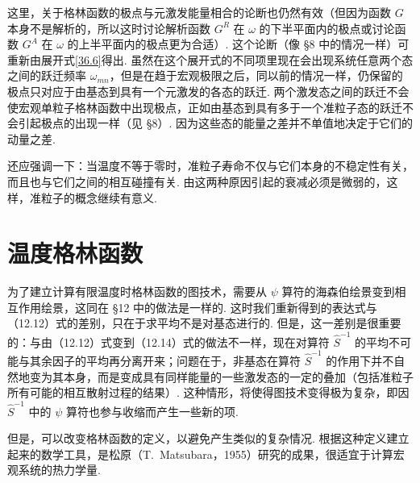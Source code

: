 这里，关于格林函数的极点与元激发能量相合的论断也仍然有效（但因为函数 $G$ 本身不是解析的，所以这时讨论解析函数 $G^{R}$ 在 $\omega$ 的下半平面内的极点或讨论函数 $G^{A}$ 在 $\omega$ 的上半平面内的极点更为合适）. 这个论断（像 §8 中的情况一样）可重新由展开式\eqref{36.6}得出. 虽然在这个展开式的不同项里现在会出现系统任意两个态之间的跃迁频率 $\omega_{mn}$，但是在趋于宏观极限之后，同以前的情况一样，仍保留的极点只对应于由基态到具有一个元激发的各态的跃迁. 两个激发态之间的跃迁不会使宏观单粒子格林函数中出现极点，正如由基态到具有多于一个准粒子态的跃迁不会引起极点的出现一样（见 §8）. 因为这些态的能量之差并不单值地决定于它们的动量之差.

还应强调一下：当温度不等于零时，准粒子寿命不仅与它们本身的不稳定性有关，而且也与它们之间的相互碰撞有关. 由这两种原因引起的衰减必须是微弱的，这样，准粒子的概念继续有意义.

\section{温度格林函数}

为了建立计算有限温度时格林函数的图技术，需要从 $\psi$ 算符的海森伯绘景变到相互作用绘景，这同在 §12 中的做法是一样的. 这时我们重新得到的表达式与（12.12）式的差别，只在于求平均不是对基态进行的. 但是，这一差别是很重要的：与由（12.12）式变到（12.14）式的做法不一样，现在对算符 $\hat S^{-1}$ 的平均不可能与其余因子的平均再分离开来；问题在于，非基态在算符 $\hat S^{-1}$ 的作用下并不自然地变为其本身，而是变成具有同样能量的一些激发态的一定的叠加（包括准粒子所有可能的相互散射过程的结果）. 这种情形，将使得图技术变得极为复杂，即因 $\hat S^{-1}$ 中的 $\psi$ 算符也参与收缩而产生一些新的项.

但是，可以改变格林函数的定义，以避免产生类似的复杂情况. 根据这种定义建立起来的数学工具，是松原（T.~Matsubara，1955）研究的成果，很适宜于计算宏观系统的热力学量.

